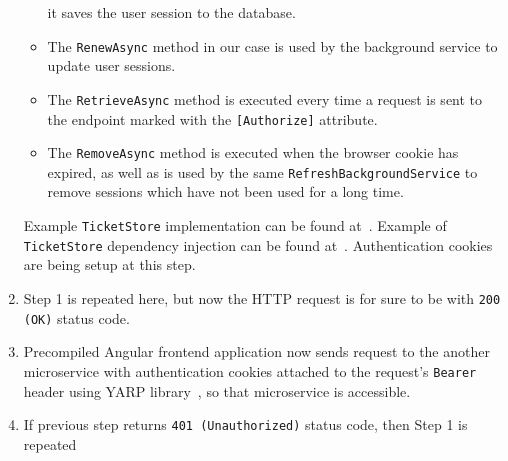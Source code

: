 \begin{enumerate}
\begin{itemize}
        it saves the user session to the database.
        \item The \texttt{RenewAsync} method in our case is used by the background service to update user sessions.
        \item The \texttt{RetrieveAsync} method is executed every time a request is sent to the endpoint marked with the
        \texttt{[Authorize]} attribute.
        \item The \texttt{RemoveAsync} method is executed when the browser cookie has expired,
        as well as is used by the same \texttt{RefreshBackgroundService}
        to remove sessions which have not been used for a long time.
    \end{itemize}
    Example \texttt{TicketStore} implementation can be found at~\cite{ticketStore_2023}.
    Example of \texttt{TicketStore} dependency injection can be found at~\cite{ticketStoreDI_2023}.
    Authentication cookies are being setup at this step.
    \item Step 1 is repeated here, but now the HTTP request is for sure to be with \texttt{200 (OK)} status code.
    \item Precompiled Angular frontend application now sends request to the another microservice with authentication cookies
    attached to the request's \texttt{Bearer} header using YARP library~\cite{microsoftYarp2021, yarpSectionAppSettings_2023},
    so that microservice is accessible.
    \item If previous step returns \texttt{401 (Unauthorized)} status code, then Step 1 is repeated
\end{enumerate}